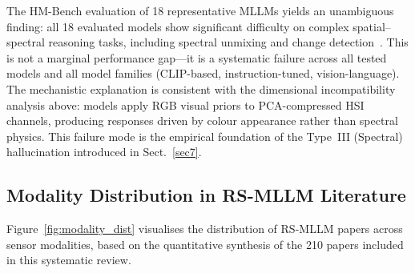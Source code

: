 The HM-Bench evaluation of 18 representative MLLMs yields an unambiguous
finding: all 18 evaluated models show significant difficulty on complex
spatial--spectral reasoning tasks, including spectral unmixing and change
detection~\cite{hmbench2026}. This is not a marginal performance gap---it is
a systematic failure across all tested models and all model families
(CLIP-based, instruction-tuned, vision-language). The mechanistic explanation
is consistent with the dimensional incompatibility analysis above: models
apply RGB visual priors to PCA-compressed HSI channels, producing responses
driven by colour appearance rather than spectral physics. This failure mode
is the empirical foundation of the Type~III (Spectral) hallucination introduced
in Sect.~\ref{sec7}.

\subsection{Modality Distribution in RS-MLLM Literature}\label{sec5:dist}

Figure~\ref{fig:modality_dist} visualises the distribution of RS-MLLM papers
across sensor modalities, based on the quantitative synthesis of the 210 papers included
in this systematic review.

